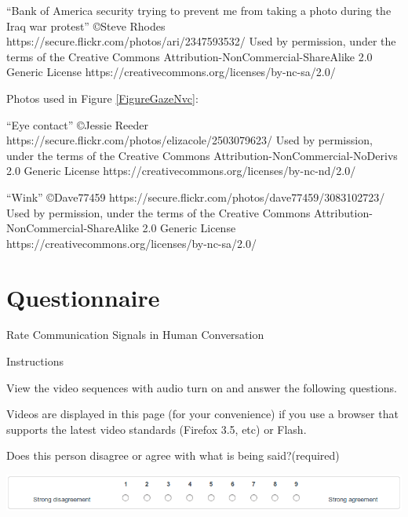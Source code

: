 \begin{appendices}
``Bank of America security trying to prevent me from taking a photo during the Iraq war protest'' \copyright Steve Rhodes \newline
https://secure.flickr.com/photos/ari/2347593532/ \newline
Used by permission, under the terms of the Creative Commons Attribution-NonCommercial-ShareAlike 2.0 Generic License \newline
https://creativecommons.org/licenses/by-nc-sa/2.0/

Photos used in Figure \ref{FigureGazeNvc}:

``Eye contact'' \copyright Jessie Reeder \newline
https://secure.flickr.com/photos/elizacole/2503079623/ \newline
Used by permission, under the terms of the Creative Commons Attribution-NonCommercial-NoDerivs 2.0 Generic License \newline
https://creativecommons.org/licenses/by-nc-nd/2.0/

``Wink'' \copyright Dave77459 \newline
https://secure.flickr.com/photos/dave77459/3083102723/ \newline
Used by permission, under the terms of the Creative Commons Attribution-NonCommercial-ShareAlike 2.0 Generic License \newline
https://creativecommons.org/licenses/by-nc-sa/2.0/

\chapter{Questionnaire}
\label{ChapterQuestionnaire}

\Large
Rate Communication Signals in Human Conversation

\large
Instructions

\normalsize 
View the video sequences with audio turn on and answer the following questions.

Videos are displayed in this page (for your convenience) if you use a browser that supports the latest video standards (Firefox 3.5, etc) or Flash.

Does this person disagree or agree with what is being said?(required)

\includegraphics[width = 0.9 \columnwidth]{corpus/questionagree.png}


\end{appendices}
